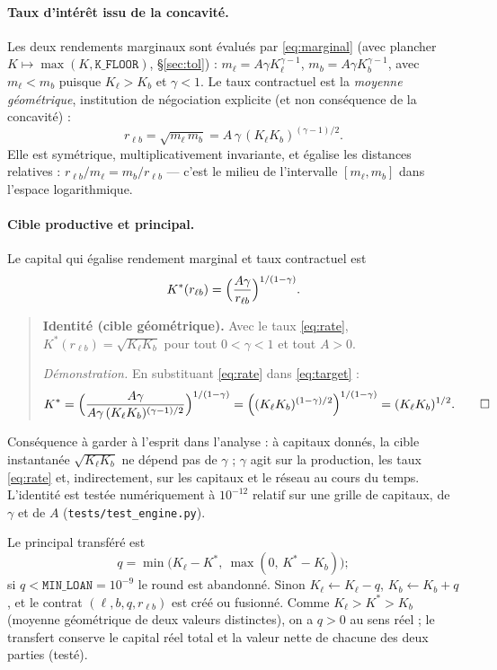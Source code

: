 \documentclass[11pt,a4paper]{article}
\newcommand{\code}[1]{\texttt{#1}}
\begin{document}
\paragraph{Taux d'intérêt issu de la concavité.}
Les deux rendements marginaux sont évalués par \eqref{eq:marginal} (avec
plancher $K\mapsto\max(K,\code{K\_FLOOR})$, §\ref{sec:tol}) :
$m_\ell=A\gamma K_\ell^{\gamma-1}$, $m_b=A\gamma K_b^{\gamma-1}$, avec
$m_\ell<m_b$ puisque $K_\ell>K_b$ et $\gamma<1$. Le taux contractuel est la
\emph{moyenne géométrique}, institution de négociation explicite (et non
conséquence de la concavité) :
\begin{equation}
r_{\ell b}=\sqrt{m_\ell\,m_b}
= A\,\gamma\,(K_\ell K_b)^{(\gamma-1)/2}.
\label{eq:rate}
\end{equation}
Elle est symétrique, multiplicativement invariante, et égalise les
distances relatives : $r_{\ell b}/m_\ell=m_b/r_{\ell b}$ — c'est le milieu
de l'intervalle $[m_\ell,m_b]$ dans l'espace logarithmique.

\paragraph{Cible productive et principal.}
Le capital qui égalise rendement marginal et taux contractuel est
\begin{equation}
K^{*}(r_{\ell b})=\Bigl(\frac{A\gamma}{r_{\ell b}}\Bigr)^{1/(1-\gamma)} .
\label{eq:target}
\end{equation}

\begin{quote}
\textbf{Identité (cible géométrique).} Avec le taux \eqref{eq:rate},
$K^{*}(r_{\ell b})=\sqrt{K_\ell K_b}$ pour tout $0<\gamma<1$ et tout $A>0$.

\emph{Démonstration.} En substituant \eqref{eq:rate} dans
\eqref{eq:target} :
\[
K^{*}
=\Bigl(\frac{A\gamma}{A\gamma\,(K_\ell K_b)^{(\gamma-1)/2}}\Bigr)^{1/(1-\gamma)}
=\Bigl((K_\ell K_b)^{(1-\gamma)/2}\Bigr)^{1/(1-\gamma)}
=(K_\ell K_b)^{1/2}. \qquad\square
\]
\end{quote}

Conséquence à garder à l'esprit dans l'analyse : à capitaux donnés, la
cible instantanée $\sqrt{K_\ell K_b}$ ne dépend pas de $\gamma$ ; $\gamma$
agit sur la production, les taux \eqref{eq:rate} et, indirectement, sur les
capitaux et le réseau au cours du temps. L'identité est testée
numériquement à $10^{-12}$ relatif sur une grille de capitaux, de $\gamma$
et de $A$ (\code{tests/test\_engine.py}).

Le principal transféré est
\begin{equation}
q=\min\bigl(K_\ell-K^{*},\ \max(0,\,K^{*}-K_b)\bigr) ;
\end{equation}
si $q<\code{MIN\_LOAN}=10^{-9}$ le round est abandonné. Sinon
$K_\ell\leftarrow K_\ell-q$, $K_b\leftarrow K_b+q$, et le contrat
$(\ell,b,q,r_{\ell b})$ est créé ou fusionné. Comme $K_\ell>K^{*}>K_b$
(moyenne géométrique de deux valeurs distinctes), on a $q>0$ au sens réel ;
le transfert conserve le capital réel total et la valeur nette de chacune
des deux parties (testé).
\end{document}
